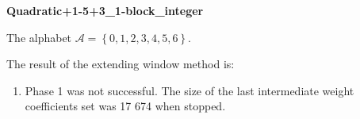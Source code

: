 \begin{exmp}
\textbf{ Quadratic+1-5+3\_1-block\_integer }

\label{ex:Quadratic+1-5+31-blockinteger}

The alphabet $\mathcal{A} =\left\{0, 1, 2, 3, 4, 5, 6\right\}$.

The result of the extending window method is:
\begin{enumerate}
    \item Phase 1 was not successful. The size of the last intermediate weight coefficients set was 17 674 when stopped. 

\end{enumerate}
\end{exmp}
